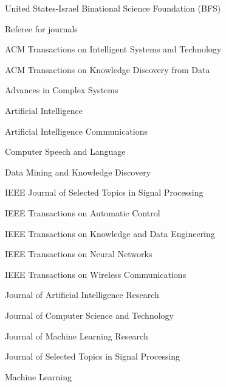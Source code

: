 \documentclass[10pt,twoside,letterpaper]{article}
\newcommand{\negitemspace}{\vspace{1mm}}
\begin{document}
\begin{compactitem}
\begin{compactitem}
\item{United States-Israel Binational Science Foundation (BFS)}

\end{compactitem}

\item{Referee for journals} \negitemspace

\begin{compactitem}

\item{ACM Transactions on Intelligent Systems and Technology}

\item{ACM Transactions on Knowledge Discovery from Data}

\item{Advances in Complex Systems}

\item{Artificial Intelligence}

\item{Artificial Intelligence Communications}

\item{Computer Speech and Language}

\item{Data Mining and Knowledge Discovery}

\item{IEEE Journal of Selected Topics in Signal Processing}

\item{IEEE Transactions on Automatic Control}

\item{IEEE Transactions on Knowledge and Data Engineering}

\item{IEEE Transactions on Neural Networks}

\item{IEEE Transactions on Wireless Communications}

\item{Journal of Artificial Intelligence Research}

\item{Journal of Computer Science and Technology}

\item{Journal of Machine Learning Research}

\item{Journal of Selected Topics in Signal Processing}

\item{Machine Learning}


\end{compactitem}
\end{compactitem}
\end{document}
